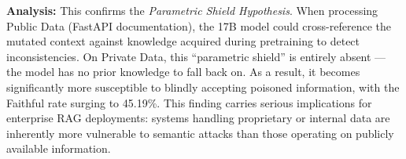 \textbf{Analysis:} This confirms the \textit{Parametric Shield Hypothesis}. When processing Public Data (FastAPI documentation), the 17B model could cross-reference the mutated context against knowledge acquired during pretraining to detect inconsistencies. On Private Data, this ``parametric shield'' is entirely absent --- the model has no prior knowledge to fall back on. As a result, it becomes significantly more susceptible to blindly accepting poisoned information, with the Faithful rate surging to 45.19\%. This finding carries serious implications for enterprise RAG deployments: systems handling proprietary or internal data are inherently more vulnerable to semantic attacks than those operating on publicly available information.

